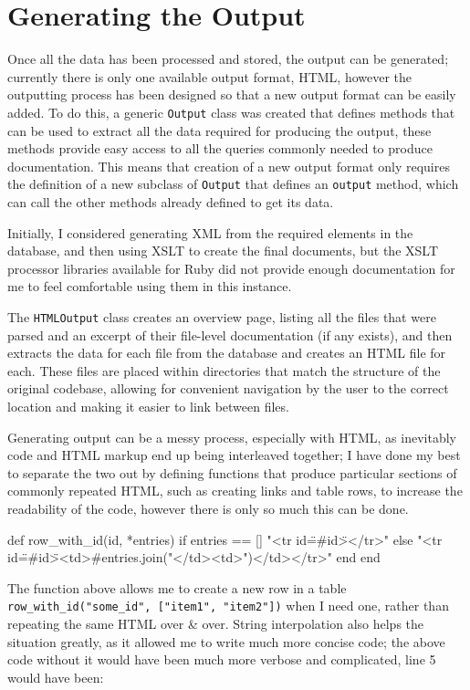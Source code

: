 \section{Generating the Output}

Once all the data has been processed and stored, the output can be generated;
currently there is only one available output format, HTML, however the
outputting process has been designed so that a new output format can be easily
added. To do this, a generic \lstinline|Output| class was created that defines
methods that can be used to extract all the data required for producing the
output, these methods provide easy access to all the queries commonly needed to
produce documentation. This means that creation of a new output format only
requires the definition of a new subclass of \lstinline|Output| that defines an
\lstinline|output| method, which can call the other methods already defined to
get its data.

Initially, I considered generating XML from the required elements in the
database, and then using XSLT to create the final documents, but the XSLT
processor libraries available for Ruby did not provide enough documentation for
me to feel comfortable using them in this instance.

The \lstinline|HTMLOutput| class creates an overview page, listing all the files
that were parsed and an excerpt of their file-level documentation (if any
exists), and then extracts the data for each file from the database and creates
an HTML file for each. These files are placed within directories that match the
structure of the original codebase, allowing for convenient navigation by the
user to the correct location and making it easier to link between files.

Generating output can be a messy process, especially with HTML, as inevitably
code and HTML markup end up being interleaved together; I have done my best to
separate the two out by defining functions that produce particular sections of
commonly repeated HTML, such as creating links and table rows, to increase the
readability of the code, however there is only so much this can be done.

\begin{code}[language=ruby, gobble=2]
  def row_with_id(id, *entries)
    if entries == []
      "<tr id=\"#{id}\"></tr>"
    else
      "<tr id=\"#{id}\"><td>#{entries.join("</td><td>")}</td></tr>\n"
    end
  end
\end{code}

The function above allows me to create a new row in a table
\lstinline|row_with_id("some_id", ["item1", "item2"])| when I need one, rather
than repeating the same HTML over \& over. String interpolation also helps the
situation greatly, as it allowed me to write much more concise code; the above
code without it would have been much more verbose and complicated, line 5 would
have been:

